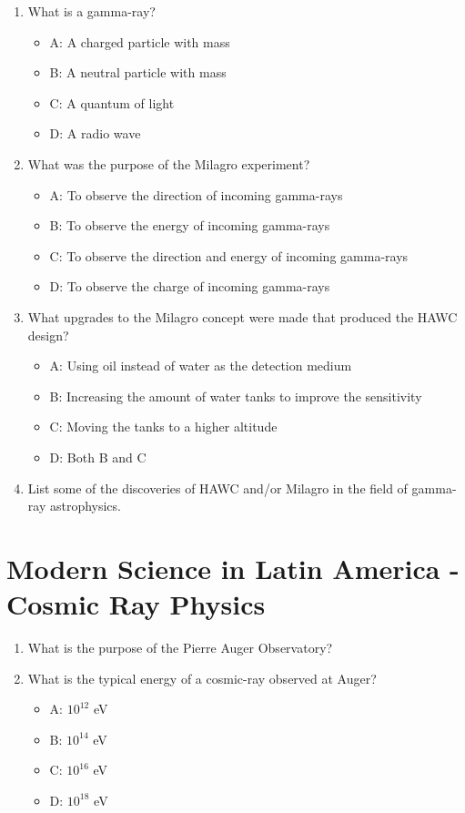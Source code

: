 \documentclass[10pt]{article}
\begin{document}
\begin{enumerate}
\item What is a gamma-ray?
\begin{itemize}
\item A: A charged particle with mass
\item B: A neutral particle with mass
\item C: A quantum of light
\item D: A radio wave
\end{itemize}
\item What was the purpose of the Milagro experiment?
\begin{itemize}
\item A: To observe the direction of incoming gamma-rays
\item B: To observe the energy of incoming gamma-rays
\item C: To observe the direction and energy of incoming gamma-rays
\item D: To observe the charge of incoming gamma-rays
\end{itemize}
\item What upgrades to the Milagro concept were made that produced the HAWC design?
\begin{itemize}
\item A: Using oil instead of water as the detection medium
\item B: Increasing the amount of water tanks to improve the sensitivity
\item C: Moving the tanks to a higher altitude
\item D: Both B and C
\end{itemize}
\item List some of the discoveries of HAWC and/or Milagro in the field of gamma-ray astrophysics. \\ \vspace{1cm}
\end{enumerate}

\section{Modern Science in Latin America - Cosmic Ray Physics}

\begin{enumerate}
\item What is the purpose of the Pierre Auger Observatory? \\ \vspace{1cm}
\item What is the typical energy of a cosmic-ray observed at Auger?
\begin{itemize}
\item A: $10^{12}$ eV
\item B: $10^{14}$ eV
\item C: $10^{16}$ eV
\item D: $10^{18}$ eV
\end{itemize}
\end{enumerate}
\end{document}
